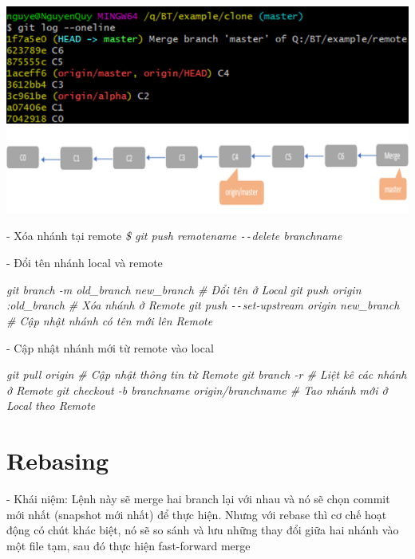 \documentclass[12pt,a4paper]{report}
\begin{document}
 \includegraphics[width=0.8\linewidth]{screenshot076}
 	\label{fig:screenshot076}
\vskip 0.4cm\vskip 0.4cm
 	\includegraphics[width=0.8\linewidth]{screenshot077}

 	\label{fig:screenshot077}
\vskip 0.4cm\vskip 0.4cm
 - Xóa nhánh tại remote
 \vskip 0.4cm
 {\it \hspace{1cm} \$ git push remotename \texttt{-{}-}delete branchname}\vskip 0.4cm
 
 - Đổi tên nhánh local và remote\vskip 0.4cm
 
 {\it \hspace{1cm}git branch -m old\_branch new\_branch         \hspace{1cm} \# Đổi tên ở Local\vskip 0.1cm
  \hspace{1cm}git push origin :old\_branch                  \hspace{1cm}\# Xóa nhánh ở Remote\vskip 0.1cm
  \hspace{1cm}git push \texttt{-{}-}set-upstream origin new\_branch   \# Cập nhật nhánh có tên mới lên  Remote\vskip 0.4cm }

 - Cập nhật nhánh mới từ remote vào local\vskip 0.4cm
 
 {\it \hspace{1cm}git pull origin                                    \hspace{1cm}\# Cập nhật thông tin từ Remote\vskip 0.1cm
  \hspace{1cm}git branch -r                                      \hspace{1cm}\# Liệt kê các nhánh ở Remote\vskip 0.1cm
  \hspace{1cm}git checkout -b branchname  origin/branchname      \hspace{1cm}\# Tao nhánh mới ở Local theo Remote\vskip 0.4cm}
 
							
\section{Rebasing}
\hspace{0.6cm}- Khái niệm: Lệnh này sẽ merge hai branch lại với nhau và nó sẽ chọn commit mới nhất (snapshot mới nhất) để thực hiện. Nhưng với rebase thì cơ chế hoạt động có chút khác biệt, nó sẽ so sánh và lưu những thay đổi giữa hai nhánh vào một file tạm, sau đó thực hiện fast-forward merge
\newpage
\end{document}
